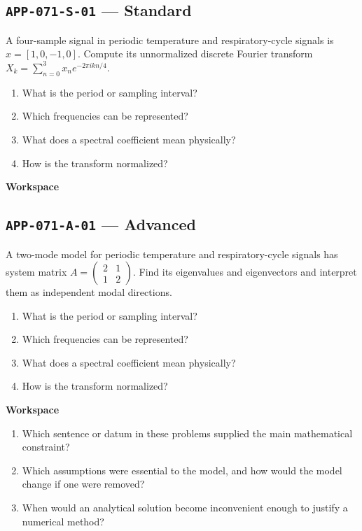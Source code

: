 \documentclass[11pt]{book}
\newcommand{\pid}[1]{\texttt{#1}}
\newcommand{\workspace}{\par\vspace{0.7in}\hrulefill\par\vspace{0.55in}\hrulefill\par}
\begin{document}
\subsection*{\pid{APP-071-S-01} — Standard}
\begin{problembox}
A four-sample signal in periodic temperature and respiratory-cycle signals is $x=[1,0,-1,0]$. Compute its unnormalized discrete Fourier transform $X_k=\sum_{n=0}^3 x_ne^{-2\pi i kn/4}$.
\end{problembox}
\begin{promptbox}\begin{enumerate}
\item What is the period or sampling interval?
\item Which frequencies can be represented?
\item What does a spectral coefficient mean physically?
\item How is the transform normalized?
\end{enumerate}\end{promptbox}
\textbf{Workspace}\workspace
{}
\subsection*{\pid{APP-071-A-01} — Advanced}
\begin{problembox}
A two-mode model for periodic temperature and respiratory-cycle signals has system matrix $A=\begin{pmatrix}2&1\\1&2\end{pmatrix}$. Find its eigenvalues and eigenvectors and interpret them as independent modal directions.
\end{problembox}
\begin{promptbox}\begin{enumerate}
\item What is the period or sampling interval?
\item Which frequencies can be represented?
\item What does a spectral coefficient mean physically?
\item How is the transform normalized?
\end{enumerate}\end{promptbox}
\textbf{Workspace}\workspace
\begin{reflectionbox}\begin{enumerate}
\item Which sentence or datum in these problems supplied the main mathematical constraint?
\item Which assumptions were essential to the model, and how would the model change if one were removed?
\item When would an analytical solution become inconvenient enough to justify a numerical method?
\end{enumerate}\end{reflectionbox}
\end{document}

